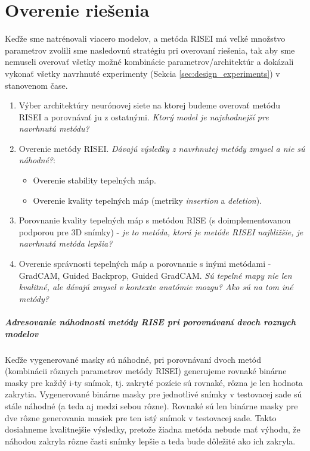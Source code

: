 \chapter{Overenie riešenia}

Keďže sme natrénovali viacero modelov, a metóda RISEI má veľké množstvo parametrov zvolili sme nasledovnú stratégiu pri overovaní riešenia, tak aby sme nemuseli overovať všetky možné kombinácie parametrov/architektúr a dokázali vykonať všetky navrhnuté experimenty (Sekcia \ref{sec:design_experiments}) v stanovenom čase.

\begin{enumerate}
    \item Výber architektúry neurónovej siete na ktorej budeme overovať metódu RISEI a porovnávať ju z ostatnými. \textit{Ktorý model je najvhodnejší pre navrhnutú metódu?}
    \item Overenie metódy RISEI. \textit{Dávajú výsledky z navrhnutej metódy zmysel a nie sú náhodné?}: 
         \begin{itemize}
             \item Overenie stability tepelných máp.
             \item Overenie kvality tepelných máp (metriky \textit{insertion} a \textit{deletion}).
         \end{itemize}
    \item Porovnanie kvality tepelných máp s metódou RISE (s doimplementovanou podporou pre 3D snímky) - \textit{je to metóda, ktorá je metóde RISEI najbližšie, je navrhnutá metóda lepšia?}
    \item Overenie správnosti tepelných máp a porovnanie s inými metódami - GradCAM, Guided Backprop, Guided GradCAM. \textit{Sú tepelné mapy nie len kvalitné, ale dávajú zmysel v kontexte anatómie mozgu? Ako sú na tom iné metódy?}
\end{enumerate}

\paragraph{Adresovanie náhodnosti metódy RISE pri porovnávaní dvoch roznych modelov}

Keďže vygenerované masky sú náhodné, pri porovnávaní dvoch metód (kombinácii rôznych parametrov metódy RISEI) generujeme rovnaké binárne masky pre každý i-ty snímok, tj. zakryté pozície sú rovnaké, rôzna je len hodnota zakrytia. Vygenerované binárne masky pre jednotlivé snímky v testovacej sade sú stále náhodné (a teda aj medzi sebou rôzne). Rovnaké sú len binárne masky pre dve rôzne generovania masiek pre ten istý snímok v testovacej sade. Takto dosiahneme kvalitnejšie výsledky, pretože žiadna metóda nebude mať výhodu, že náhodou zakryla rôzne časti snímky lepšie a teda bude dôležité ako ich zakryla.

